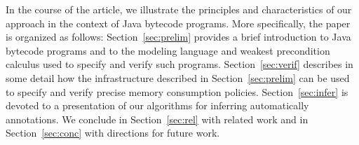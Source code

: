 In the course of the article, we illustrate the principles and
characteristics of our approach in the context of Java bytecode
programs. More specifically, the paper is organized as follows:
Section~\ref{sec:prelim} provides a brief introduction to Java
bytecode programs and to the modeling language and weakest
precondition calculus used to specify and verify such programs.
Section~\ref{sec:verif} describes in some detail how the
infrastructure described in Section~\ref{sec:prelim} can be used to
specify and verify precise memory consumption
policies. Section~\ref{sec:infer} is devoted to a presentation of our
algorithms for inferring automatically annotations. We conclude in
Section~\ref{sec:rel} with related work and in Section~\ref{sec:conc}
with directions for future work.


